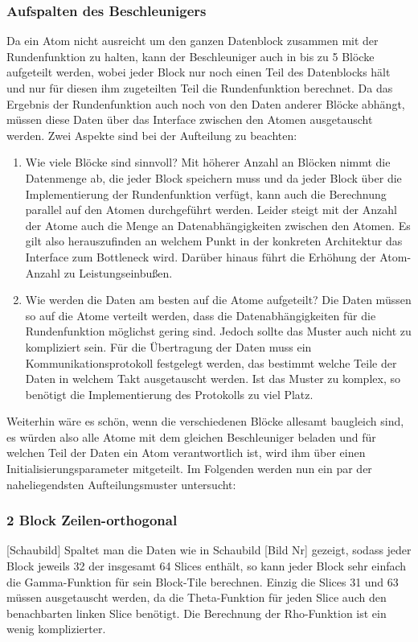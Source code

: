 \subsubsection{Aufspalten des Beschleunigers}
Da ein Atom nicht ausreicht um den ganzen Datenblock zusammen mit der Rundenfunktion zu halten, kann der Beschleuniger auch in bis zu 5 Blöcke aufgeteilt werden,
wobei jeder Block nur noch einen Teil des Datenblocks hält und nur für diesen ihm zugeteilten Teil die Rundenfunktion berechnet. Da das Ergebnis der Rundenfunktion
auch noch von den Daten anderer Blöcke abhängt, müssen diese Daten über das Interface zwischen den Atomen ausgetauscht werden. Zwei Aspekte sind bei der Aufteilung zu beachten:
\begin{enumerate}
    \item Wie viele Blöcke sind sinnvoll? Mit höherer Anzahl an Blöcken nimmt die Datenmenge ab, die jeder Block speichern muss und da jeder Block über die Implementierung der Rundenfunktion
    verfügt, kann auch die Berechnung parallel auf den Atomen durchgeführt werden. Leider steigt mit der Anzahl der Atome auch die Menge an Datenabhängigkeiten zwischen den Atomen.
    Es gilt also herauszufinden an welchem Punkt in der konkreten Architektur das Interface zum Bottleneck wird. Darüber hinaus führt die Erhöhung der Atom-Anzahl zu Leistungseinbußen.
    \item Wie werden die Daten am besten auf die Atome aufgeteilt? Die Daten müssen so auf die Atome verteilt werden, dass die Datenabhängigkeiten für die Rundenfunktion möglichst gering sind.
    Jedoch sollte das Muster auch nicht zu kompliziert sein. Für die Übertragung der Daten muss ein Kommunikationsprotokoll festgelegt werden, das bestimmt welche Teile der Daten in welchem Takt ausgetauscht werden.
    Ist das Muster zu komplex, so benötigt die Implementierung des Protokolls zu viel Platz.
\end{enumerate}

Weiterhin wäre es schön, wenn die verschiedenen Blöcke allesamt baugleich sind, es würden also alle Atome mit dem gleichen Beschleuniger beladen und für welchen Teil der Daten ein Atom verantwortlich ist,
wird ihm über einen Initialisierungsparameter mitgeteilt. Im Folgenden werden nun ein par der naheliegendsten Aufteilungsmuster untersucht:

\subsubsection{2 Block Zeilen-orthogonal}
[Schaubild]
Spaltet man die Daten wie in Schaubild [Bild Nr] gezeigt, sodass jeder Block jeweils 32 der insgesamt 64 Slices enthält, so kann jeder Block sehr einfach die Gamma-Funktion für sein Block-Tile berechnen.
Einzig die Slices 31 und 63 müssen ausgetauscht werden, da die Theta-Funktion für jeden Slice auch den benachbarten linken Slice benötigt.
Die Berechnung der Rho-Funktion ist ein wenig komplizierter. 

